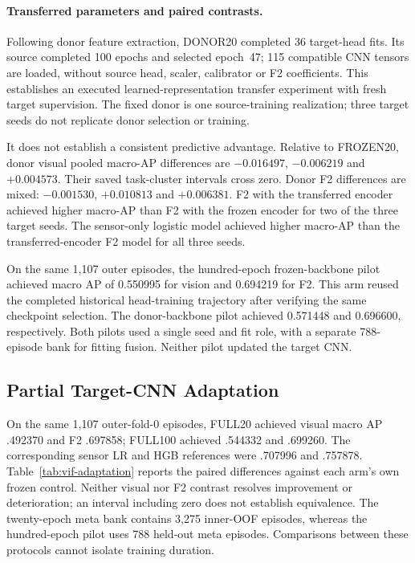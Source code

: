 \paragraph{Transferred parameters and paired contrasts.}
Following donor feature extraction, DONOR20 completed 36 target-head fits. Its source
completed 100 epochs and selected epoch~47; 115 compatible CNN tensors are loaded,
without source head, scaler, calibrator or F2 coefficients. This establishes an executed
learned-representation transfer experiment with fresh target supervision. The fixed
donor is one source-training realization; three target seeds do not replicate donor
selection or training.

It does not establish a consistent predictive advantage. Relative to FROZEN20, donor
visual pooled macro-AP differences are $-0.016497$, $-0.006219$ and $+0.004573$. Their
saved task-cluster intervals cross zero. Donor F2 differences are mixed: $-0.001530$,
$+0.010813$ and $+0.006381$. F2 with the transferred encoder achieved higher macro-AP
than F2 with the frozen encoder for two of the three target seeds. The sensor-only
logistic model achieved higher macro-AP than the transferred-encoder F2 model for all
three seeds.

On the same 1,107 outer episodes, the hundred-epoch frozen-backbone pilot achieved macro
AP of 0.550995 for vision and 0.694219 for F2. This arm reused the completed historical
head-training trajectory after verifying the same checkpoint selection. The
donor-backbone pilot achieved 0.571448 and 0.696600, respectively. Both pilots used a
single seed and fit role, with a separate 788-episode bank for fitting fusion. Neither
pilot updated the target CNN.

\subsection{Partial Target-CNN Adaptation}
On the same 1,107 outer-fold-0 episodes, FULL20 achieved visual macro AP .492370 and F2
.697858; FULL100 achieved .544332 and .699260. The corresponding sensor LR and HGB
references were .707996 and .757878. Table~\ref{tab:vif-adaptation} reports the paired
differences against each arm's own frozen control. Neither visual nor F2 contrast
resolves improvement or deterioration; an interval including zero does not establish
equivalence. The twenty-epoch meta bank contains 3,275 inner-OOF episodes, whereas the
hundred-epoch pilot uses 788 held-out meta episodes. Comparisons between these protocols
cannot isolate training duration.

